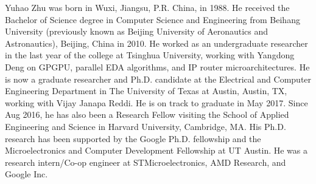 
\begin{vita}
Yuhao Zhu was born in Wuxi, Jiangsu, P.R. China, in 1988. He received the Bachelor of Science degree in Computer Science and Engineering from Beihang University (previously known as Beijing University of Aeronautics and Astronautics), Beijing, China in 2010. He worked as an undergraduate researcher in the last year of the college at Tsinghua University, working with Yangdong Deng on GPGPU, parallel EDA algorithms, and IP router microarchitectures. He is now a graduate researcher and Ph.D. candidate at the Electrical and Computer Engineering Department in The University of Texas at Austin, Austin, TX, working with Vijay Janapa Reddi. He is on track to graduate in May 2017. Since Aug 2016, he has also been a Research Fellow visiting the School of Applied Engineering and Science in Harvard University, Cambridge, MA. His Ph.D. research has been supported by the Google Ph.D. fellowship and the Microelectronics and Computer Development Fellowship at UT Austin. He was a research intern/Co-op engineer at STMicroelectronics, AMD Research, and Google Inc.

\end{vita}

